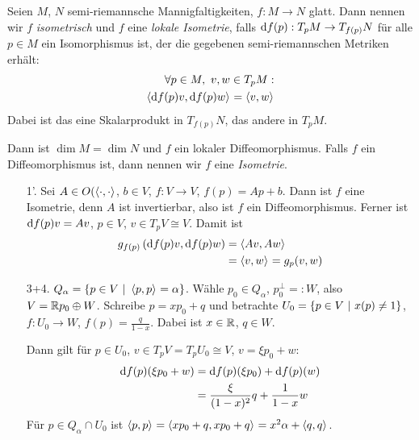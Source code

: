 \documentclass{skript}
\begin{document}
\begin{dfn}
  Seien $M$, $N$ semi-riemannsche Mannigfaltigkeiten, $f:M\to N$ glatt. Dann
  nennen wir $f$ \emph{isometrisch} und $f$ eine \emph{lokale Isometrie}, falls
  $\mathrm d f(p) : T_pM\to T_{f(p)}N$ für alle $p\in M$ ein Isomorphismus ist, der die
  gegebenen semi-riemannschen Metriken erhält:
  \begin{align*}
    \forall p\in M,\ v,w\in T_pM: \\
    \sprod{\d f(p)v, \d f(p)w} = \sprod{v,w}
  \end{align*}
  Dabei ist das eine Skalarprodukt in $T_{f(p)}N$, das andere in $T_pM$.

  \begin{bem}
    Dann ist $\dim M = \dim N$ und $f$ ein lokaler Diffeomorphismus. Falls $f$
    ein Diffeomorphismus ist, dann nennen wir $f$ eine \emph{Isometrie}.
  \end{bem}

  \begin{bsps}
    \begin{enumerate}
      \item[1'\!\!.] Sei $A\in O(\sprod{\cdot, \cdot}$, $b\in V$, $f: V\to V$,
        $f(p) = Ap + b$. Dann ist $f$ eine Isometrie, denn $A$ ist invertierbar,
        also ist $f$ ein Diffeomorphismus. Ferner ist $\mathrm d f(p)v = Av$, $p\in V$,
        $v\in T_pV \cong V$. Damit ist 
        \begin{align*}
          g_{f(p)}\left( \d f(p)v, \d f(p)w \right) &= \sprod{Av, Aw} \\
          &= \sprod{v,w} = g_p(v,w)
        \end{align*}
      \item[3+4.]$Q_\alpha = \mdef[p\in V]{\sprod{p,p} = \alpha}$. Wähle $p_0\in
        Q_\alpha$, $p_0^\perp =: W$, also $V=\mathbb{R} p_0\oplus W$. Schreibe $p = xp_0
        + q$ und betrachte $U_0 = \mdef[p\in V]{x(p) \ne 1}$, $f:U_0\to W$,
        $f(p) = \frac{q}{1-x}$. Dabei ist $x\in \mathbb{R}$, $q\in W$.

        Dann gilt für $p\in U_0$, $v\in T_pV =  T_pU_0 \cong V$, $v = \xi p_0 +
        w$:
        \begin{align*}
          \mathrm d f(p)(\xi p_0 + w) &= \mathrm d f(p)(\xi p_0) + \mathrm d f(p)(w) \\
          &= \frac{\xi}{(1-x)^2}q + \frac{1}{1-x}w
        \end{align*}
        Für $p\in Q_\alpha \cap U_0$ ist $\sprod{p,p} = \sprod{xp_0 + q, xp_0 +
        q} = x^2\alpha + \sprod{q,q}$.


\end{enumerate}
\end{bsps}
\end{dfn}
\end{document}
